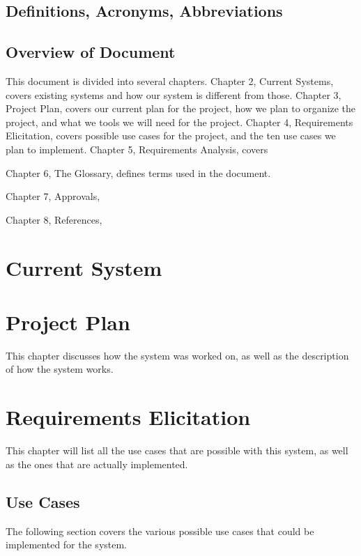 \documentclass[letter,12pt]{report}
\begin{document}
\section{Definitions, Acronyms, Abbreviations}

\section{Overview of Document}
This document is divided into several chapters.
Chapter 2, Current Systems, covers existing systems and how our system
is different from those.
Chapter 3, Project Plan, covers our current plan for the project,
how we plan to organize the project, and what we tools we will need for the project.
Chapter 4, Requirements Elicitation, covers possible use cases for the project,
and the ten use cases we plan to implement.
Chapter 5, Requirements Analysis, covers

Chapter 6, The Glossary, defines terms used in the document.

Chapter 7, Approvals,

Chapter 8, References,

\chapter{Current System}

\chapter{Project Plan}
This chapter discusses how the system was worked on, as well as the description of how the system works.


\newpage


\chapter{Requirements Elicitation}
This chapter will list all the use cases that are possible with this system, as well as the ones that are actually implemented.
\section{Use Cases}
The following section covers the various possible use cases
that could be implemented for the system.
\newpage

\newpage

\newpage
\end{document}
